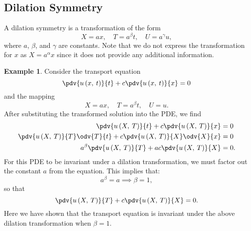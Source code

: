 \documentclass{article}
\theoremstyle{definition}
\newtheorem{example}{Example}[section]
\begin{document}
\subsection{Dilation Symmetry}
A dilation symmetry is a transformation of the form
\begin{equation*}
    X = a x, \quad T = a^\beta t, \quad U = a^\gamma u,
\end{equation*}
where \(a\), \(\beta\), and \(\gamma\) are constants. Note that we do
not express the transformation for \(x\) as \(X = a^\alpha x\) since it
does not provide any additional information.
\begin{example}
    Consider the transport equation
    \begin{equation*}
        \pdv{u\left( x,\: t \right)}{t} + c \pdv{u\left( x,\: t \right)}{x} = 0
    \end{equation*}
    and the mapping
    \begin{equation*}
        X = a x, \quad T = a^\beta t, \quad U = u.
    \end{equation*}
    After substituting the transformed solution into the PDE, we find
    \begin{align*}
        \pdv{u\left( X,\: T \right)}{t} + c \pdv{u\left( X,\: T \right)}{x}                       & = 0  \\
        \pdv{u\left( X,\: T \right)}{T} \odv{T}{t} + c \pdv{u\left( X,\: T \right)}{X} \odv{X}{x} & = 0  \\
        a^\beta \pdv{u\left( X,\: T \right)}{T} + a c \pdv{u\left( X,\: T \right)}{X}             & = 0.
    \end{align*}
    For this PDE to be invariant under a dilation transformation, we
    must factor out the constant \(a\) from the equation. This implies
    that:
    \begin{equation*}
        a^\beta = a \implies \beta = 1,
    \end{equation*}
    so that
    \begin{equation*}
        \pdv{u\left( X,\: T \right)}{T} + c \pdv{u\left( X,\: T \right)}{X} = 0.
    \end{equation*}
    Here we have shown that the transport equation is invariant under
    the above dilation transformation when \(\beta = 1\).
\end{example}
\end{document}
